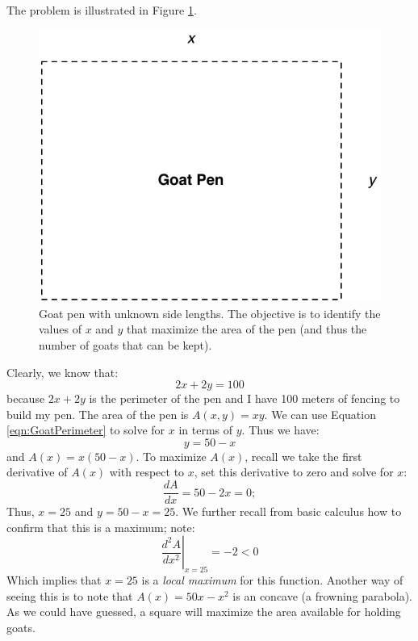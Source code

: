 The problem is illustrated in Figure \ref{fig:GoatPen}.
\begin{figure}[htbp]
\centering
\includegraphics[scale=0.6]{imported_figures/GoatPen.pdf}
\caption{Goat pen with unknown side lengths. The objective is to identify the values of $x$ and $y$ that maximize the area of the pen (and thus the number of goats that can be kept).}
\label{fig:GoatPen}
\end{figure}
Clearly, we know that:
\begin{equation}
2x + 2y = 100
\label{eqn:GoatPerimeter}
\end{equation}
because $2x + 2y$ is the perimeter of the pen and I have 100 meters of fencing to build my pen. The area of the pen is $A(x,y) = xy$. We can use Equation \ref{eqn:GoatPerimeter} to solve for $x$ in terms of $y$. Thus we have:
\begin{equation}
y = 50 - x
\end{equation}
and $A(x) = x(50-x)$. To maximize $A(x)$, recall we take the first derivative of $A(x)$ with respect to $x$, set this derivative to zero and solve for $x$:
\begin{equation}
\frac{dA}{dx} = 50-2x = 0;
\end{equation}
Thus, $x = 25$ and $y = 50-x = 25$. We further recall from basic calculus how to confirm that this is a maximum; note:
\begin{equation}
\left.\frac{d^2A}{dx^2}\right|_{x = 25} = -2 < 0
\end{equation}
Which implies that $x = 25$ is a \textit{local maximum} for this function. Another way of seeing this is to note that $A(x) = 50x-x^2$ is an concave (a frowning parabola). As we could have guessed, a square will maximize the area available for holding goats. 

